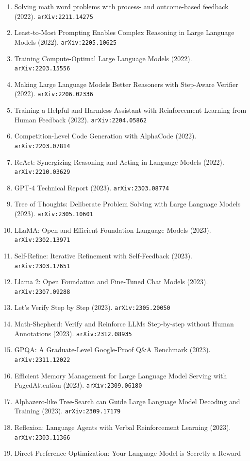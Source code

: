\documentclass[11pt]{article}
\begin{document}
\begin{enumerate}
  \item Solving math word problems with process- and outcome-based feedback (2022). \texttt{arXiv:2211.14275}
  \item Least-to-Most Prompting Enables Complex Reasoning in Large Language
  Models (2022). \texttt{arXiv:2205.10625}
  \item Training Compute-Optimal Large Language Models (2022). \texttt{arXiv:2203.15556}
  \item Making Large Language Models Better Reasoners with Step-Aware Verifier (2022). \texttt{arXiv:2206.02336}
  \item Training a Helpful and Harmless Assistant with Reinforcement Learning
  from Human Feedback (2022). \texttt{arXiv:2204.05862}
  \item Competition-Level Code Generation with AlphaCode (2022). \texttt{arXiv:2203.07814}
  \item ReAct: Synergizing Reasoning and Acting in Language Models (2022). \texttt{arXiv:2210.03629}
  \item GPT-4 Technical Report (2023). \texttt{arXiv:2303.08774}
  \item Tree of Thoughts: Deliberate Problem Solving with Large Language Models (2023). \texttt{arXiv:2305.10601}
  \item LLaMA: Open and Efficient Foundation Language Models (2023). \texttt{arXiv:2302.13971}
  \item Self-Refine: Iterative Refinement with Self-Feedback (2023). \texttt{arXiv:2303.17651}
  \item Llama 2: Open Foundation and Fine-Tuned Chat Models (2023). \texttt{arXiv:2307.09288}
  \item Let's Verify Step by Step (2023). \texttt{arXiv:2305.20050}
  \item Math-Shepherd: Verify and Reinforce LLMs Step-by-step without Human
  Annotations (2023). \texttt{arXiv:2312.08935}
  \item GPQA: A Graduate-Level Google-Proof Q\&A Benchmark (2023). \texttt{arXiv:2311.12022}
  \item Efficient Memory Management for Large Language Model Serving with
  PagedAttention (2023). \texttt{arXiv:2309.06180}
  \item Alphazero-like Tree-Search can Guide Large Language Model Decoding and
  Training (2023). \texttt{arXiv:2309.17179}
  \item Reflexion: Language Agents with Verbal Reinforcement Learning (2023). \texttt{arXiv:2303.11366}
  \item Direct Preference Optimization: Your Language Model is Secretly a Reward

\end{enumerate}
\end{document}
